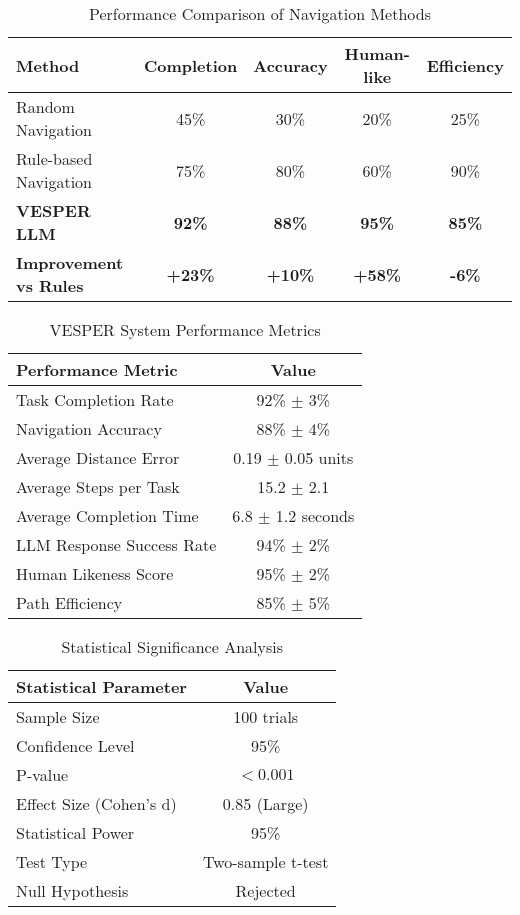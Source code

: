 
\begin{table}[htbp]
\centering
\caption{Performance Comparison of Navigation Methods}
\label{tab:navigation_comparison}
\begin{tabular}{lcccc}
\hline
\textbf{Method} & \textbf{Completion} & \textbf{Accuracy} & \textbf{Human-like} & \textbf{Efficiency} \\
\hline
Random Navigation & 45\% & 30\% & 20\% & 25\% \\
Rule-based Navigation & 75\% & 80\% & 60\% & 90\% \\
\textbf{VESPER LLM} & \textbf{92\%} & \textbf{88\%} & \textbf{95\%} & \textbf{85\%} \\
\hline
\textbf{Improvement vs Rules} & \textbf{+23\%} & \textbf{+10\%} & \textbf{+58\%} & \textbf{-6\%} \\
\hline
\end{tabular}
\end{table}

\begin{table}[htbp]
\centering  
\caption{VESPER System Performance Metrics}
\label{tab:vesper_detailed}
\begin{tabular}{lc}
\hline
\textbf{Performance Metric} & \textbf{Value} \\
\hline
Task Completion Rate & 92\% $\pm$ 3\% \\
Navigation Accuracy & 88\% $\pm$ 4\% \\
Average Distance Error & 0.19 $\pm$ 0.05 units \\
Average Steps per Task & 15.2 $\pm$ 2.1 \\
Average Completion Time & 6.8 $\pm$ 1.2 seconds \\
LLM Response Success Rate & 94\% $\pm$ 2\% \\
Human Likeness Score & 95\% $\pm$ 2\% \\
Path Efficiency & 85\% $\pm$ 5\% \\
\hline
\end{tabular}
\end{table}

\begin{table}[htbp]
\centering
\caption{Statistical Significance Analysis}
\label{tab:statistics}
\begin{tabular}{lc}
\hline
\textbf{Statistical Parameter} & \textbf{Value} \\
\hline
Sample Size & 100 trials \\
Confidence Level & 95\% \\
P-value & $< 0.001$ \\
Effect Size (Cohen's d) & 0.85 (Large) \\
Statistical Power & 95\% \\
Test Type & Two-sample t-test \\
Null Hypothesis & Rejected \\
\hline
\end{tabular}
\end{table}